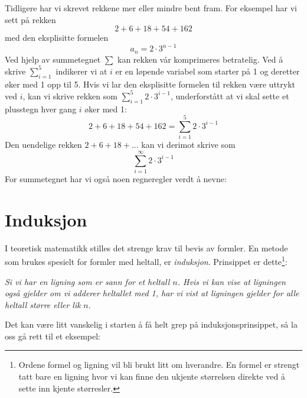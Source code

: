 Tidligere har vi skrevet rekkene mer eller mindre bent fram. For eksempel har vi sett på rekken
\[ 2+6+18+54+162 \]
med den eksplisitte formelen
\[ a_n = 2\cdot3^{n-1} \]
Ved hjelp av summetegnet $ \sum $ kan rekken vår komprimeres betratelig. Ved å skrive $ \sum\limits_{i=1}^5 $ indikerer vi at $ i $ er en løpende variabel som starter på 1 og deretter øker med 1 opp til 5. Hvis vi lar den eksplisitte formelen til rekken være uttrykt ved $ i $, kan vi skrive rekken som $ \sum\limits_{i=1}^5 2\cdot3^{i-1} $, underforstått at vi skal sette et plusstegn hver gang $ i $ øker med 1:
\[ 2+6+18+54+162=\sum\limits_{i=1}^5 2\cdot3^{i-1} \]
Den uendelige rekken 
$ 2+6+18+... $ kan vi derimot skrive som
\[ \sum\limits_{i=1}^\infty 2\cdot3^{i-1} \]
\newpage
For summetegnet har vi også noen regneregler verdt å nevne:\regv
{}

\section{Induksjon} 
I teoretisk matematikk stilles det strenge krav til bevis av formler. En metode som brukes spesielt for formler med heltall, er \textit{induksjon}. Prinsippet er dette\footnote{Ordene formel og ligning vil bli brukt litt om hverandre. En formel er strengt tatt bare en ligning hvor vi kan finne den ukjente størrelsen direkte ved å sette inn kjente størresler.}:\vsk

\textsl{Si vi har en ligning som er sann for et heltall $ n $. Hvis vi kan vise at ligningen også gjelder om vi adderer heltallet med 1, har vi vist at ligningen gjelder for alle heltall større eller lik} $ n $.\vsk

Det kan være litt vanskelig i starten å få helt grep på induksjonsprinsippet, så la oss gå rett til et eksempel:\vsk

